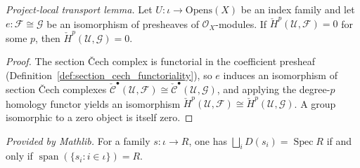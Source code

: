 \begin{lemma}
  \label{lem:cechCohomology_isZero_of_iso}
  \textit{Project-local transport lemma.}
  Let \(U : \iota \to \mathrm{Opens}(X)\) be an index family and let \(e : \mathcal{F} \cong
  \mathcal{G}\) be an isomorphism of presheaves of \(\mathcal{O}_X\)-modules. If
  \(\check{H}^p(\mathcal{U}, \mathcal{F}) = 0\) for some \(p\), then
  \(\check{H}^p(\mathcal{U}, \mathcal{G}) = 0\).
\end{lemma}
\begin{proof}
  \leanok
  The section {\v C}ech complex is functorial in the coefficient presheaf
  (Definition~\ref{def:section_cech_functoriality}), so \(e\) induces an isomorphism of section
  {\v C}ech complexes \(\check{\mathcal{C}}^\bullet(\mathcal{U}, \mathcal{F}) \cong
  \check{\mathcal{C}}^\bullet(\mathcal{U}, \mathcal{G})\), and applying the degree-\(p\) homology
  functor yields an isomorphism \(\check{H}^p(\mathcal{U}, \mathcal{F}) \cong
  \check{H}^p(\mathcal{U}, \mathcal{G})\). A group isomorphic to a zero object is itself zero.
\end{proof}

\begin{lemma}
  \label{lem:iSup_basicOpen_eq_top_iff_span}
  \mathlibok
  \textit{Provided by Mathlib.}
  For a family \(s : \iota \to R\), one has \(\bigsqcup_i D(s_i) = \operatorname{Spec} R\) if and only
  if \(\operatorname{span}(\{s_i : i \in \iota\}) = R\).
\end{lemma}


